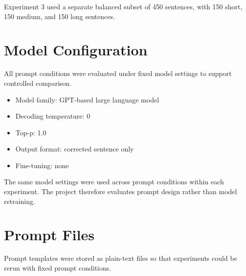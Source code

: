 Experiment 3 used a separate balanced subset of 450 sentences, with 150 short, 150 medium, and 150 long sentences.

\section{Model Configuration}

All prompt conditions were evaluated under fixed model settings to support controlled comparison.

\begin{itemize}
    \item Model family: GPT-based large language model
    \item Decoding temperature: 0
    \item Top-p: 1.0
    \item Output format: corrected sentence only
    \item Fine-tuning: none
\end{itemize}

The same model settings were used across prompt conditions within each experiment. The project therefore evaluates prompt design rather than model retraining.

\section{Prompt Files}

Prompt templates were stored as plain-text files so that experiments could be rerun with fixed prompt conditions.

